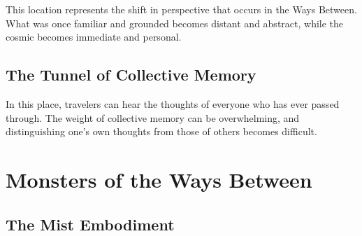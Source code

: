 \documentclass[11pt]{article}
\begin{document}
This location represents the shift in perspective that occurs in the Ways Between. What was once familiar and grounded becomes distant and abstract, while the cosmic becomes immediate and personal.

\subsection{The Tunnel of Collective Memory}

In this place, travelers can hear the thoughts of everyone who has ever passed through. The weight of collective memory can be overwhelming, and distinguishing one's own thoughts from those of others becomes difficult.

\section{Monsters of the Ways Between}

\subsection{The Mist Embodiment}
\end{document}
